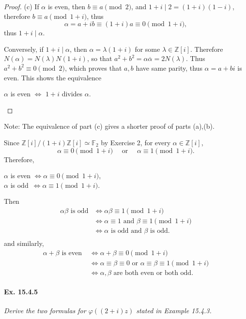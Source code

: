 \documentclass[11pt,a4paper]{article}
\newcommand{\Z}{\mathbb{Z}}
\newcommand{\F}{\mathbb{F}}
\begin{document}
\begin{proof}
\item[(c)] If $\alpha$ is even, then $b \equiv a \pmod 2$, and $1 +i \mid 2 = (1+i)(1-i)$, therefore $b \equiv a \pmod {1+i}$, thus
$$\alpha = a + ib \equiv (1+i)a \equiv 0 \pmod {1+i},$$
thus $1+i \mid \alpha$.

Conversely, if $1+i \mid \alpha$, then $\alpha = \lambda(1+i)$ for some $\lambda \in \Z[i]$. Therefore $N(\alpha) = N(\lambda) N(1+i)$, so that $a^2 +b^2 = \alpha \overline{\alpha} = 2 N(\lambda)$. Thus $a^2+b^2 \equiv 0 \pmod 2$, which proves that $a,b$ have same parity, thus $\alpha = a+bi$ is even. This shows the equivalence
\begin{center}
$\alpha$ is even $\iff$ $1+i$ divides $\alpha$.
\end{center}
\end{proof} 
Note: The equivalence of part (c) gives a shorter proof of parts (a),(b). 

Since $\Z[i]/(1+i)\Z[i] \simeq \F_2$ by Exercise 2, for every $\alpha \in \Z[i]$, 
$$\alpha \equiv 0 \pmod {1+i} \quad  \text{ or }\quad  \alpha \equiv 1 \pmod {1+i}.$$
Therefore, 
\begin{center}
$\alpha$ is even $\iff \alpha \equiv 0 \pmod {1+i}$,\\
$\alpha$ is odd \,$\iff \alpha \equiv 1 \pmod {1+i}$.
\end{center}
Then 
\begin{align*}
\alpha \beta \text{ is odd} &\iff \alpha \beta \equiv 1 \pmod {1+i}\\
&\iff \alpha \equiv 1 \text{ and } \beta \equiv 1 \pmod{1+i}\\
&\iff \alpha \text { is odd and } \beta \text { is odd.}\\
\end{align*}
and similarly,
\begin{align*}
\alpha + \beta \text{ is even } &\iff \alpha + \beta \equiv 0 \pmod {1+i}\\
&\iff \alpha \equiv \beta \equiv 0 \text{ or } \alpha \equiv \beta \equiv 1 \pmod {1+i}\\
&\iff \alpha,\beta \text{ are both even or both odd}.
\end{align*}

\paragraph{Ex. 15.4.5}{\it Derive the two formulas for $\varphi\left((2+i)z\right)$ stated in Example 15.4.3.
}
\end{document}
